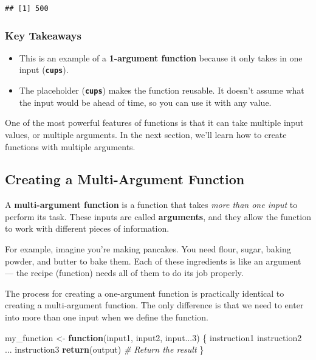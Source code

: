 \documentclass[
]{book}
\newenvironment{Shaded}{\begin{snugshade}}{\end{snugshade}}
\newcommand{\CommentTok}[1]{\textcolor[rgb]{0.56,0.35,0.01}{\textit{#1}}}
\newcommand{\ControlFlowTok}[1]{\textcolor[rgb]{0.13,0.29,0.53}{\textbf{#1}}}
\newcommand{\DecValTok}[1]{\textcolor[rgb]{0.00,0.00,0.81}{#1}}
\newcommand{\FunctionTok}[1]{\textcolor[rgb]{0.13,0.29,0.53}{\textbf{#1}}}
\newcommand{\NormalTok}[1]{#1}
\newcommand{\OtherTok}[1]{\textcolor[rgb]{0.56,0.35,0.01}{#1}}
\begin{document}
\begin{verbatim}
## [1] 500
\end{verbatim}

\subsubsection{Key Takeaways}\label{key-takeaways}

\begin{itemize}
\item
  This is an example of a \textbf{1-argument function} because it only takes in one input (\textbf{\texttt{cups}}).
\item
  The placeholder (\textbf{\texttt{cups}}) makes the function reusable. It doesn't assume what the input would be ahead of time, so you can use it with any value.
\end{itemize}

One of the most powerful features of functions is that it can take multiple input values, or multiple arguments. In the next section, we'll learn how to create functions with multiple arguments.

\subsection{Creating a Multi-Argument Function}\label{creating-a-multi-argument-function}

A \textbf{multi-argument function} is a function that takes \emph{more than one input} to perform its task. These inputs are called \textbf{arguments}, and they allow the function to work with different pieces of information.

For example, imagine you're making pancakes. You need flour, sugar, baking powder, and butter to bake them. Each of these ingredients is like an argument --- the recipe (function) needs all of them to do its job properly.

The process for creating a one-argument function is practically identical to creating a multi-argument function. The only difference is that we need to enter into more than one input when we define the function.

\begin{Shaded}
\begin{Highlighting}[]
\NormalTok{my\_function }\OtherTok{\textless{}{-}} \ControlFlowTok{function}\NormalTok{(input1, input2, input...}\DecValTok{3}\NormalTok{) \{}
\NormalTok{  instruction1}
\NormalTok{  instruction2}
\NormalTok{  ...}
\NormalTok{  instruction3}
  \FunctionTok{return}\NormalTok{(output) }\CommentTok{\# Return the result}
\NormalTok{\}}
\end{Highlighting}
\end{Shaded}
\end{document}
